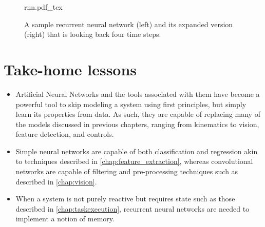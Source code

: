 \begin{figure}
\tiny
    \centering
    \def\svgwidth{\textwidth}
    {rnn.pdf_tex}
    \caption{A sample recurrent neural network (left) and its expanded version (right) that is looking back four time steps. \label{fig:rnn}}
\end{figure}

\section*{Take-home lessons}
\begin{itemize}
\item Artificial Neural Networks and the tools associated with them have become a powerful tool to skip modeling a system using first principles, but simply learn its properties from data. As such, they are capable of replacing many of the models discussed in previous chapters, ranging from kinematics to vision, feature detection, and controls.
\item Simple neural networks are capable of both classification and regression akin to techniques described in \cref{chap:feature_extraction}, whereas convolutional networks are capable of filtering and pre-processing techniques such as described in \cref{chap:vision}.
\item When a system is not purely reactive but requires state such as those described in \cref{chap:taskexecution}, recurrent neural networks are needed to implement a notion of memory.
\end{itemize}
